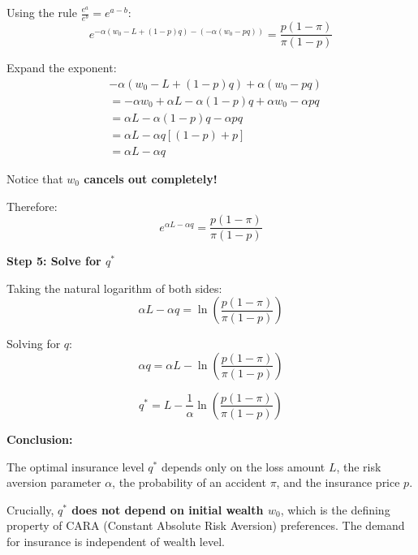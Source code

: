 \documentclass[12pt]{article}
\begin{document}
Using the rule $\frac{e^a}{e^b} = e^{a-b}$:
\begin{equation}
e^{-\alpha(w_0 - L + (1-p)q) - (-\alpha(w_0 - pq))} = \frac{p(1-\pi)}{\pi(1-p)}
\end{equation}

Expand the exponent:
\begin{align}
&-\alpha(w_0 - L + (1-p)q) + \alpha(w_0 - pq) \\
&= -\alpha w_0 + \alpha L - \alpha(1-p)q + \alpha w_0 - \alpha pq \\
&= \alpha L - \alpha(1-p)q - \alpha pq \\
&= \alpha L - \alpha q[(1-p) + p] \\
&= \alpha L - \alpha q
\end{align}

Notice that \textbf{$w_0$ cancels out completely!}

Therefore:
\begin{equation}
e^{\alpha L - \alpha q} = \frac{p(1-\pi)}{\pi(1-p)}
\end{equation}

\vspace{0.3cm}

\textbf{Step 5: Solve for $q^*$}

Taking the natural logarithm of both sides:
\begin{equation}
\alpha L - \alpha q = \ln\left(\frac{p(1-\pi)}{\pi(1-p)}\right)
\end{equation}

Solving for $q$:
\begin{equation}
\alpha q = \alpha L - \ln\left(\frac{p(1-\pi)}{\pi(1-p)}\right)
\end{equation}

\begin{equation}
\boxed{q^* = L - \frac{1}{\alpha}\ln\left(\frac{p(1-\pi)}{\pi(1-p)}\right)}
\end{equation}

\vspace{0.5cm}

\textbf{Conclusion:}

The optimal insurance level $q^*$ depends only on the loss amount $L$, the risk aversion parameter $\alpha$, the probability of an accident $\pi$, and the insurance price $p$.

Crucially, \textbf{$q^*$ does not depend on initial wealth $w_0$}, which is the defining property of CARA (Constant Absolute Risk Aversion) preferences. The demand for insurance is independent of wealth level.
\end{document}
